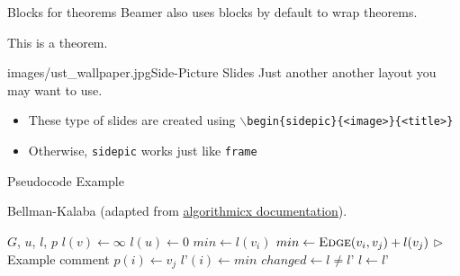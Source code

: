 \documentclass[]{beamer}
\newcommand{\hrefcol}[2]{\textcolor{uihteal}{\href{#1}{#2}}}
\begin{document}
\begin{frame}[fragile]{Blocks for theorems}
Beamer also uses blocks by default to wrap theorems.
\begin{theorem} This is a theorem. \end{theorem}
\end{frame}


\begin{sidepic}{images/ust_wallpaper.jpg}{Side-Picture Slides}
Just another another layout you may want to use.
\begin{itemize}
\item These type of slides are created using \texttt{$\backslash$begin\{sidepic\}\{<image>\}\{<title>\}}
\item Otherwise, \texttt{sidepic} works just like \texttt{frame}
\end{itemize}
\end{sidepic}


\renewcommand{\algorithmicrequire}{\textbf{Input:}}
\renewcommand{\algorithmicensure}{\textbf{Output:}}
\newcommand*\CALL[2]{\textsc{#1}(#2)}
\newcommand*\ANNOTATE[1]{\hfill\(\triangleright\) #1}%

\footlinecolor{}

\begin{frame}[fragile]{Pseudocode Example}
\begin{algorithm}[H]
\fontsize{8}{1}\selectfont
\caption{Bellman-Kalaba (adapted from \hrefcol{https://www.ctan.org/tex-archive/macros/latex/contrib/algorithmicx/algorithmicx.pdf}{algorithmicx documentation}).}
\begin{algorithmic}
\REQUIRE $G$, $u$, $l$, $p$
    \STATE $l(v) \leftarrow \infty$
\ENDFOR
\STATE $l(u) \leftarrow 0$
\REPEAT
        \STATE $min \leftarrow l(v_i)$
            \IF {$min > \CALL{Edge}{v_i, v_j} + l(v_j)$}
                \STATE $min \leftarrow \CALL{Edge}{v_i, v_j} + l(v_j)$ \ANNOTATE{Example comment}
                \STATE $p(i) \leftarrow v_j$
            \ENDIF
        \ENDFOR
        \STATE $l’(i) \leftarrow min$
    \ENDFOR
    \STATE $changed \leftarrow l \not= l’$
    \STATE $l \leftarrow l’$
\end{algorithmic}
\end{algorithm}
\end{frame}
\end{document}
